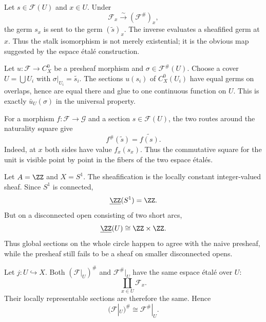 \begin{example}
Let $s\in\mathcal F(U)$ and $x\in U$.  Under
\[
\mathcal F_x\xrightarrow{\sim}(\mathcal F^\#)_x,
\]
the germ $s_x$ is sent to the germ $(\widetilde s)_x$.  The inverse evaluates a sheafified
germ at $x$.  Thus the stalk isomorphism is not merely existential; it is the obvious map
suggested by the espace \'{e}tal\'{e} construction.
\end{example}

\begin{example}
Let $u:\mathcal F\to C^0_X$ be a presheaf morphism and
$\sigma\in\mathcal F^\#(U)$.  Choose a cover $U=\bigcup U_i$ with
$\sigma|_{U_i}=\widetilde{s_i}$.  The sections $u(s_i)$ of $C^0_X(U_i)$ have equal germs on
overlaps, hence are equal there and glue to one continuous function on $U$.  This is exactly
$\bar u_U(\sigma)$ in the universal property.
\end{example}

\begin{example}
For a morphism $f:\mathcal F\to\mathcal G$ and a section $s\in\mathcal F(U)$, the two routes
around the naturality square give
\[
f^\#(\widetilde s)=\widetilde{f(s)}.
\]
Indeed, at $x$ both sides have value $f_x(s_x)$.  Thus the commutative square for the unit is
visible point by point in the fibers of the two espace \'{e}tal\'{e}s.
\end{example}

\begin{example}
Let $A=\ZZ$ and $X=S^1$.  The sheafification is the locally constant integer-valued sheaf.
Since $S^1$ is connected,
\[
\underline\ZZ(S^1)=\ZZ.
\]
But on a disconnected open consisting of two short arcs,
\[
\underline\ZZ(U)\cong\ZZ\times\ZZ.
\]
Thus global sections on the whole circle happen to agree with the naive presheaf, while the
presheaf still fails to be a sheaf on smaller disconnected opens.
\end{example}

\begin{example}
Let $j:U\hookrightarrow X$.  Both $(\mathcal F|_U)^\#$ and
$\mathcal F^\#|_U$ have the same espace \'{e}tal\'{e} over $U$:
\[
\coprod_{x\in U}\mathcal F_x.
\]
Their locally representable sections are therefore the same.  Hence
\[
(\mathcal F|_U)^\#\cong\mathcal F^\#|_U.
\]
\end{example}


